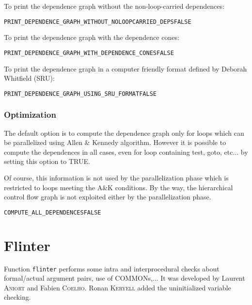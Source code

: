 \documentclass[a4paper]{report}
\newenvironment{PipsProp}{\begin{alltt}}{\end{alltt}}
\begin{document}
To print the dependence graph without the non-loop-carried dependences:

\begin{PipsProp}
PRINT_DEPENDENCE_GRAPH_WITHOUT_NOLOOPCARRIED_DEPS FALSE
\end{PipsProp}

To print the dependence graph with the dependence cones:

\begin{PipsProp}
PRINT_DEPENDENCE_GRAPH_WITH_DEPENDENCE_CONES FALSE
\end{PipsProp}

To print the dependence graph in a computer friendly format defined by
Deborah Whitfield (SRU):

\begin{PipsProp}
PRINT_DEPENDENCE_GRAPH_USING_SRU_FORMAT FALSE
\end{PipsProp}

\subsubsection{Optimization}

The default option is to compute the dependence graph only for loops
which can be parallelized using Allen \& Kennedy algorithm.  However it
is possible to compute the dependences in all cases, even for loop
containing test, goto, etc...  by setting this option to TRUE.

Of course, this information is not used by the parallelization phase
which is restricted to loops meeting the A\&K conditions. By the way,
the hierarchical control flow graph is not exploited either by the
parallelization phase.

\begin{PipsProp}
COMPUTE_ALL_DEPENDENCES FALSE
\end{PipsProp}




\section{Flinter}
\label{subsection-flinter}

Function \verb+flinter+ performs some intra and interprocedural checks
about formal/actual argument pairs, use of COMMONs,... It was developed by
Laurent \textsc{Aniort} and Fabien \textsc{Coelho}. Ronan \textsc{Keryell}
added the uninitialized variable checking.
\end{document}
